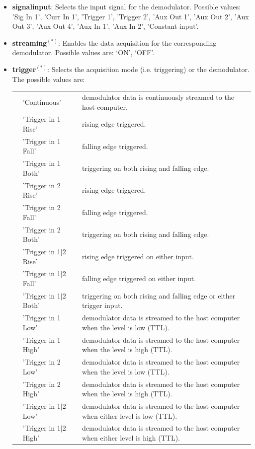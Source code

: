 \documentclass[11pt]{article} %
\begin{document}
\begin{itemize}
	\item {\bf signalinput}: Selects the input signal for the demodulator. Possible values: 'Sig In 1', 'Curr In 1', 'Trigger 1', 'Trigger 2', 'Aux Out 1', 'Aux Out 2', 'Aux Out 3', 'Aux Out 4', 'Aux In 1', 'Aux In 2', 'Constant input'.
	\item {\bf streaming}$^{(*)}$: Enables the data acquisition for the corresponding demodulator. Possible values are: `ON', `OFF'.
	\item {\bf trigger}$^{(*)}$: Selects the acquisition mode (i.e. triggering) or the demodulator. The possible values are:
	\begin{longtable}{p{1.5cm}p{4cm}p{11cm}}
	&'Continuous' & demodulator data is continuously streamed to the host computer. \\
	&'Trigger in 1 Rise' & rising edge triggered. \\
	&'Trigger in 1 Fall' & falling edge triggered. \\
	&'Trigger in 1 Both' & triggering on both rising and falling edge. \\
	&'Trigger in 2 Rise' & rising edge triggered. \\
	&'Trigger in 2 Fall' & falling edge triggered. \\
	&'Trigger in 2 Both' & triggering on both rising and falling edge. \\
	&'Trigger in 1$\mid$2 Rise' & rising edge triggered on either input. \\
	&'Trigger in 1$\mid$2 Fall' & falling edge triggered on either input. \\
	&'Trigger in 1$\mid$2 Both' & triggering on both rising and falling edge or either trigger input. \\
	&'Trigger in 1 Low' & demodulator data is streamed to the host computer when the level is low (TTL). \\
	&'Trigger in 1 High' & demodulator data is streamed to the host computer when the level is high (TTL). \\
	&'Trigger in 2 Low' & demodulator data is streamed to the host computer when the level is low (TTL). \\
	&'Trigger in 2 High' & demodulator data is streamed to the host computer when the level is high (TTL). \\
	&'Trigger in 1$\mid$2 Low' & demodulator data is streamed to the host computer when either level is low (TTL). \\
	&'Trigger in 1$\mid$2 High' & demodulator data is streamed to the host computer when either level is high (TTL). \\

\end{longtable}
\end{itemize}
\end{document}
